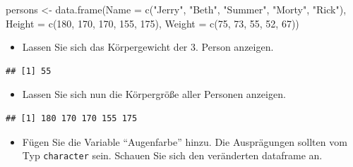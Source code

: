 \documentclass[12pt,a4paper]{article}
\newenvironment{Shaded}{\begin{snugshade}}{\end{snugshade}}
\newcommand{\AttributeTok}[1]{\textcolor[rgb]{0.77,0.63,0.00}{#1}}
\newcommand{\DecValTok}[1]{\textcolor[rgb]{0.00,0.00,0.81}{#1}}
\newcommand{\FunctionTok}[1]{\textcolor[rgb]{0.00,0.00,0.00}{#1}}
\newcommand{\NormalTok}[1]{#1}
\newcommand{\OtherTok}[1]{\textcolor[rgb]{0.56,0.35,0.01}{#1}}
\newcommand{\SpecialCharTok}[1]{\textcolor[rgb]{0.00,0.00,0.00}{#1}}
\newcommand{\StringTok}[1]{\textcolor[rgb]{0.31,0.60,0.02}{#1}}
\begin{document}
\begin{Shaded}
\begin{Highlighting}[]
\NormalTok{    persons }\OtherTok{\textless{}{-}} \FunctionTok{data.frame}\NormalTok{(}\AttributeTok{Name   =} \FunctionTok{c}\NormalTok{(}\StringTok{"Jerry"}\NormalTok{, }\StringTok{"Beth"}\NormalTok{, }\StringTok{"Summer"}\NormalTok{, }\StringTok{"Morty"}\NormalTok{, }\StringTok{"Rick"}\NormalTok{),}
                          \AttributeTok{Height =} \FunctionTok{c}\NormalTok{(}\DecValTok{180}\NormalTok{, }\DecValTok{170}\NormalTok{, }\DecValTok{170}\NormalTok{, }\DecValTok{155}\NormalTok{, }\DecValTok{175}\NormalTok{),}
                          \AttributeTok{Weight =} \FunctionTok{c}\NormalTok{(}\DecValTok{75}\NormalTok{, }\DecValTok{73}\NormalTok{, }\DecValTok{55}\NormalTok{, }\DecValTok{52}\NormalTok{, }\DecValTok{67}\NormalTok{))}
\end{Highlighting}
\end{Shaded}

\begin{itemize}
  \item Lassen Sie sich das Körpergewicht der 3. Person anzeigen.
\end{itemize}

\begin{Shaded}
\end{Shaded}

\begin{verbatim}
## [1] 55
\end{verbatim}

\begin{itemize}
  \item Lassen Sie sich nun die Körpergröße aller Personen anzeigen.
\end{itemize}

\begin{Shaded}
\end{Shaded}

\begin{verbatim}
## [1] 180 170 170 155 175
\end{verbatim}

\begin{itemize}
  \item Fügen Sie die Variable “Augenfarbe” hinzu. Die Ausprägungen sollten vom Typ \texttt{character} sein. Schauen Sie sich den veränderten dataframe an.
\end{itemize}
\end{document}

